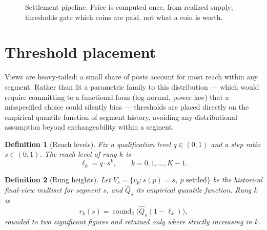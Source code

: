 \documentclass[11pt]{article}
\newtheorem{definition}{Definition}
\begin{document}
\begin{figure}[h]
\centering
{}
\caption{Settlement pipeline. Price is computed once, from realized supply; thresholds gate which
coins are paid, not what a coin is worth.}
\label{fig:pipeline}
\end{figure}

\section{Threshold placement}
\label{sec:thresholds}

Views are heavy-tailed: a small share of posts account for most reach within any segment. Rather
than fit a parametric family to this distribution — which would require committing to a functional
form (log-normal, power law) that a misspecified choice could silently bias — thresholds are placed
directly on the empirical quantile function of segment history, avoiding any distributional
assumption beyond exchangeability within a segment.

\begin{definition}[Reach levels]
Fix a qualification level $q \in (0,1)$ and a step ratio $s \in (0,1)$. The reach level of rung $k$
is
$$
\ell_k = q \cdot s^{k}, \qquad k = 0, 1, \dots, K-1.
$$
\end{definition}

\begin{definition}[Rung heights]
Let $V_s = \{v_p : s(p) = s,\ p \text{ settled}\}$ be the historical final-view multiset for segment
$s$, and $\hat{Q}_s$ its empirical quantile function. Rung $k$ is
$$
r_k(s) = \operatorname{round}_2\!\big(\hat{Q}_s(1 - \ell_k)\big),
$$
rounded to two significant figures and retained only where strictly increasing in $k$.
\end{definition}
\end{document}
